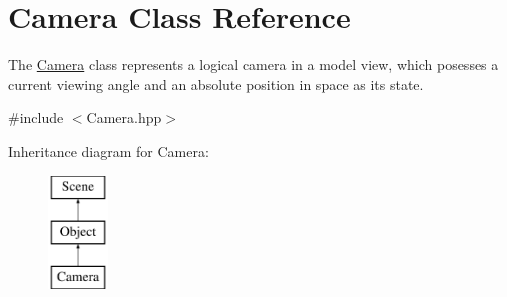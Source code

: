 \hypertarget{class_camera}{\section{Camera Class Reference}
\label{class_camera}
}


The \hyperlink{class_camera}{Camera} class represents a logical camera in a model view, which posesses a current viewing angle and an absolute position in space as its state.  




{\ttfamily \#include $<$Camera.\-hpp$>$}

Inheritance diagram for Camera\-:\begin{figure}[H]
\begin{center}
\leavevmode
\includegraphics[height=3.000000cm]{class_camera}
\end{center}
\end{figure}
